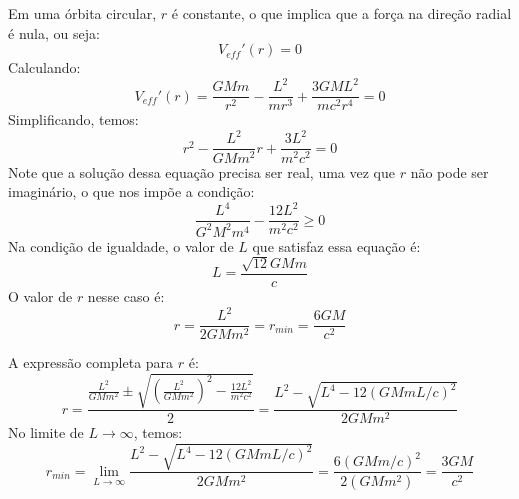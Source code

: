 \documentclass[11pt]{article}
\begin{document}
\begin{pproblem}
\begin{pssolution*}{}{}
\begin{alternativas}
            \item Em uma órbita circular, \(r\) é constante, o que implica que a força na direção radial é nula, ou seja:
            \[V_{eff}'(r) = 0\]
            Calculando:
            \[V_{eff}'(r) = \frac{GMm}{r^2}-\frac{L^2}{mr^3}+\frac{3GML^2}{mc^2r^4}=0\]
            Simplificando, temos:
            \[r^2-\frac{L^2}{GMm^2}r+\frac{3L^2}{m^2c^2}=0\]
            Note que a solução dessa equação precisa ser real, uma vez que \(r\) não pode ser imaginário, o que nos impõe a condição:
            \[\frac{L^4}{G^2M^2m^4} - \frac{12L^2}{m^2c^2} \geq 0\]
            Na condição de igualdade, o valor de \(L\) que satisfaz essa equação é:
            \[\boxed{L = \frac{\sqrt{12}GMm}{c}}\]
            O valor de \(r\) nesse caso é:
            \[r = \frac{L^2}{2GMm^2} = \boxed{r_{min} = \frac{6GM}{c^2}}\] 
            
            \item A expressão completa para \(r\) é:
            \[r = \frac{\frac{L^2}{GMm^2}\pm\sqrt{\left(\frac{L^2}{GMm^2}\right)^2-\frac{12L^2}{m^2c^2}}}{2} = \frac{L^2-\sqrt{L^4-12(GMmL/c)^2}}{2GMm^2}\] 
            No limite de \(L\rightarrow \infty\), temos:
            \[r_{min} = \lim_{L \rightarrow \infty}\frac{L^2-\sqrt{L^4-12(GMmL/c)^2}}{2GMm^2} = \frac{6(GMm/c)^2}{2(GMm^2)} = \boxed{\frac{3GM}{c^2}} \] 
        \end{alternativas}
    \end{pssolution*}
\end{pproblem}
\end{document}
